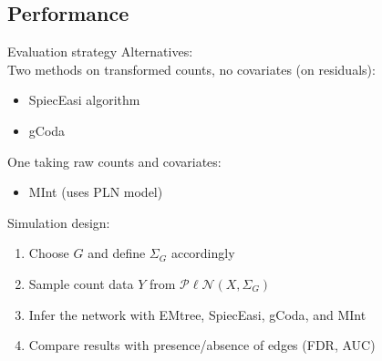 \documentclass[11pt]{beamer}
\newcommand{\emphase}[1]{\textcolor{Complement}{#1}}
\newcommand{\bleu}[1]{\textcolor{Framableulight}{#1}}
\begin{document}
\subsection{Performance}
\begin{frame}{Evaluation strategy}
\bleu{Alternatives:}\\
 Two methods  on \bleu{transformed counts, no covariates (on residuals)}:\\
    \begin{itemize}
        \item \emphase{SpiecEasi} algorithm \citet{kurtz} 
        \item \emphase{gCoda} \citet{gcoda} 
    \end{itemize}
    
    One taking \bleu{raw counts and covariates}:\\
    \begin{itemize}
        \item \emphase{MInt} \citet{MInt} (uses PLN model)
    \end{itemize}\bigskip
\pause
\bleu{Simulation design:}\\
\begin{enumerate}
     \item Choose  \emphase{$G$} and define  \emphase{$\Sigma_G$} accordingly
     \item Sample count data \emphase{$Y$} from $\mathcal{P\ell N}(X,\Sigma_G)$ 
     \item Infer the network with \emphase{EMtree},  \emphase{SpiecEasi},  \emphase{gCoda}, and  \emphase{MInt} 
     \item Compare results with  presence/absence of edges (\emphase{FDR}, \emphase{AUC})
\end{enumerate}

\end{frame}

\end{document}
